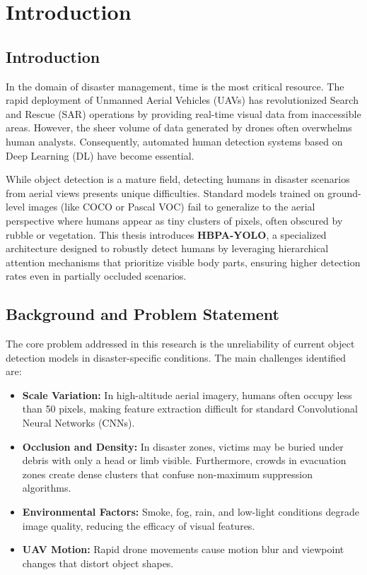 \documentclass[12pt, a4paper]{report}
\begin{document}
\newpage
{}
\setcounter{page}{1}

\chapter{Introduction}

\section{Introduction}
In the domain of disaster management, time is the most critical resource. The rapid deployment of Unmanned Aerial Vehicles (UAVs) has revolutionized Search and Rescue (SAR) operations by providing real-time visual data from inaccessible areas. However, the sheer volume of data generated by drones often overwhelms human analysts. Consequently, automated human detection systems based on Deep Learning (DL) have become essential. 

While object detection is a mature field, detecting humans in disaster scenarios from aerial views presents unique difficulties. Standard models trained on ground-level images (like COCO or Pascal VOC) fail to generalize to the aerial perspective where humans appear as tiny clusters of pixels, often obscured by rubble or vegetation. This thesis introduces \textbf{HBPA-YOLO}, a specialized architecture designed to robustly detect humans by leveraging hierarchical attention mechanisms that prioritize visible body parts, ensuring higher detection rates even in partially occluded scenarios.

\section{Background and Problem Statement}
The core problem addressed in this research is the unreliability of current object detection models in disaster-specific conditions. The main challenges identified are:
\begin{itemize}
    \item \textbf{Scale Variation:} In high-altitude aerial imagery, humans often occupy less than 50 pixels, making feature extraction difficult for standard Convolutional Neural Networks (CNNs).
    \item \textbf{Occlusion and Density:} In disaster zones, victims may be buried under debris with only a head or limb visible. Furthermore, crowds in evacuation zones create dense clusters that confuse non-maximum suppression algorithms.
    \item \textbf{Environmental Factors:} Smoke, fog, rain, and low-light conditions degrade image quality, reducing the efficacy of visual features.
    \item \textbf{UAV Motion:} Rapid drone movements cause motion blur and viewpoint changes that distort object shapes.
\end{itemize}
\end{document}
